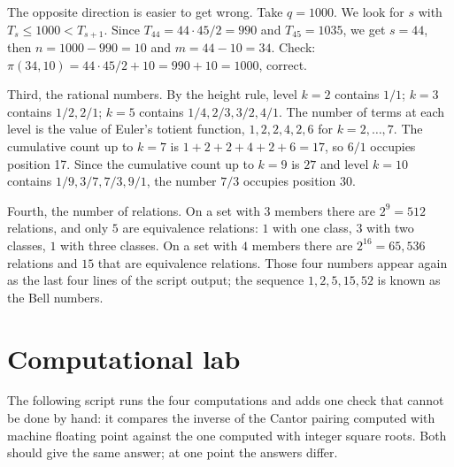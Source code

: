 The opposite direction is easier to get wrong. Take $q = 1000$. We look for $s$ with
$T_s \le 1000 < T_{s+1}$. Since $T_{44} = 44 \cdot 45/2 = 990$ and $T_{45} = 1035$, we
get $s = 44$, then $n = 1000 - 990 = 10$ and $m = 44 - 10 = 34$. Check:
$\pi(34,10) = 44 \cdot 45/2 + 10 = 990 + 10 = 1000$, correct.

Third, the rational numbers. By the height rule, level $k = 2$ contains $1/1$;
$k = 3$ contains $1/2, 2/1$; $k = 5$ contains $1/4, 2/3, 3/2, 4/1$. The number of terms
at each level is the value of Euler's totient function, $1, 2, 2, 4, 2, 6$ for
$k = 2, \dots, 7$. The cumulative count up to $k = 7$ is $1+2+2+4+2+6 = 17$, so $6/1$
occupies position 17. Since the cumulative count up to $k = 9$ is $27$ and level
$k = 10$ contains $1/9, 3/7, 7/3, 9/1$, the number $7/3$ occupies position 30.

Fourth, the number of relations. On a set with $3$ members there are $2^{9} = 512$
relations, and only $5$ are equivalence relations: $1$ with one class, $3$ with two
classes, $1$ with three classes. On a set with $4$ members there are $2^{16} = 65{,}536$
relations and $15$ that are equivalence relations. Those four numbers appear again as
the last four lines of the script output; the sequence $1, 2, 5, 15, 52$ is known as
the Bell numbers.


\section{Computational lab}

The following script runs the four computations and adds one check that cannot be done
by hand: it compares the inverse of the Cantor pairing computed with machine floating
point against the one computed with integer square roots. Both should give the same
answer; at one point the answers differ.

